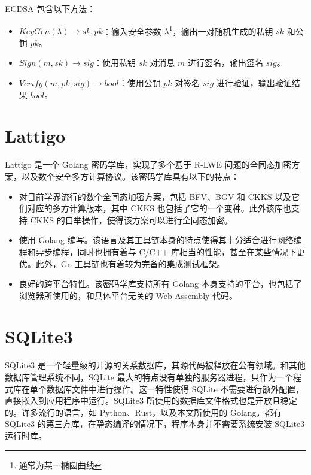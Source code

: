 ECDSA 包含以下方法：

\begin{itemize}
    \item $KeyGen(\lambda) \rightarrow sk, pk$：输入安全参数 $\lambda$\footnote{通常为某一椭圆曲线}，输出一对随机生成的私钥 $sk$ 和公钥 $pk$。
    \item $Sign(m, sk) \rightarrow sig$：使用私钥 $sk$ 对消息 $m$ 进行签名，输出签名 $sig$。
    \item $Verify(m, pk, sig) \rightarrow bool$：使用公钥 $pk$ 对签名 $sig$ 进行验证，输出验证结果 $bool$。
\end{itemize}

\section{Lattigo}

Lattigo 是一个 Golang 密码学库，实现了多个基于 R-LWE 问题的全同态加密方案，以及数个安全多方计算协议。\cite{Mouchet2020LattigoAM,lattigoRepo}该密码学库具有以下的特点：

\begin{itemize}
    \item 对目前学界流行的数个全同态加密方案，包括 BFV、BGV 和 CKKS 以及它们对应的多方计算版本，其中 CKKS 也包括了它的一个变种\cite{cryptoeprint:2018/952}。此外该库也支持 CKKS 的自举操作，使得该方案可以进行全同态加密。
    \item 使用 Golang 编写。该语言及其工具链本身的特点使得其十分适合进行网络编程和异步编程，同时也拥有着与 C/C++ 库相当的性能，甚至在某些情况下更优。此外，Go 工具链也有着较为完备的集成测试框架。
    \item 良好的跨平台特性。该密码学库支持所有 Golang 本身支持的平台，也包括了浏览器所使用的，和具体平台无关的 Web Assembly 代码。
\end{itemize}

\section{SQLite3}

SQLite3 是一个轻量级的开源的关系数据库，其源代码被释放在公有领域\cite{sqlite3}。和其他数据库管理系统不同，SQLite 最大的特点没有单独的服务器进程，只作为一个程式库在单个数据库文件中进行操作。这一特性使得 SQLite 不需要进行额外配置，直接嵌入到应用程序中运行。SQLite3 所使用的数据库文件格式也是开放且稳定的。许多流行的语言，如 Python、Rust，以及本文所使用的 Golang，都有 SQLite3 的第三方库，在静态编译的情况下，程序本身并不需要系统安装 SQLite3 运行时库。

